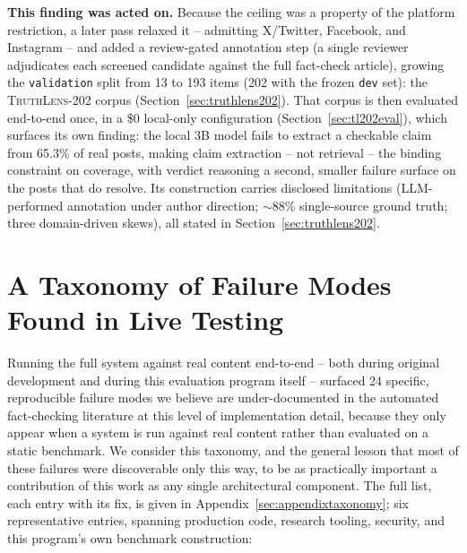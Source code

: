 \documentclass[conference]{IEEEtran}
\begin{document}
\textbf{This finding was acted on.} Because the ceiling was a property
of the platform restriction, a later pass relaxed it -- admitting
X/Twitter, Facebook, and Instagram -- and added a review-gated
annotation step (a single reviewer adjudicates each screened candidate
against the full fact-check article), growing the \texttt{validation}
split from 13 to 193 items (202 with the frozen \texttt{dev} set): the
\textsc{TruthLens-202} corpus (Section~\ref{sec:truthlens202}). That
corpus is then evaluated end-to-end once, in a \$0 local-only
configuration (Section~\ref{sec:tl202eval}), which surfaces its own
finding: the local 3B model fails to extract a checkable claim from
65.3\% of real posts, making claim extraction -- not retrieval -- the
binding constraint on coverage, with verdict reasoning a second, smaller
failure surface on the posts that do resolve. Its construction carries
disclosed limitations (LLM-performed annotation under author direction;
$\sim$88\% single-source ground truth; three domain-driven skews), all stated in
Section~\ref{sec:truthlens202}.

\section{A Taxonomy of Failure Modes Found in Live Testing}
\label{sec:failuremodes}

Running the full system against real content end-to-end -- both during
original development and during this evaluation program itself --
surfaced 24 specific, reproducible failure modes we believe are
under-documented in the automated fact-checking literature at this level
of implementation detail, because they only appear when a system is run
against real content rather than evaluated on a static benchmark. We
consider this taxonomy, and the general lesson that most of these
failures were discoverable only this way, to be as practically important
a contribution of this work as any single architectural component. The
full list, each entry with its fix, is given in
Appendix~\ref{sec:appendixtaxonomy}; six representative entries,
spanning production code, research tooling, security, and this
program's own benchmark construction:
\end{document}
